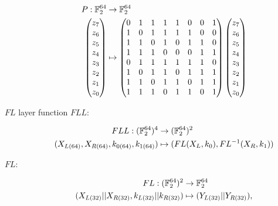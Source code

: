 \begin{description}
\begin{align*}
    P:\mathbb{F}_2^{64} &\rightarrow \mathbb{F}_2^{64} \\
    \begin{pmatrix}z_7\\z_6\\z_5\\z_4\\z_3\\z_2\\z_1\\z_0\end{pmatrix}&\mapsto
    \begin{pmatrix}
        0 & 1 & 1 & 1 & 1 & 0 & 0 & 1 \\
        1 & 0 & 1 & 1 & 1 & 1 & 0 & 0 \\
        1 & 1 & 0 & 1 & 0 & 1 & 1 & 0 \\
        1 & 1 & 1 & 0 & 0 & 0 & 1 & 1 \\
        0 & 1 & 1 & 1 & 1 & 1 & 1 & 0 \\
        1 & 0 & 1 & 1 & 0 & 1 & 1 & 1 \\
        1 & 1 & 0 & 1 & 1 & 0 & 1 & 1 \\
        1 & 1 & 1 & 0 & 1 & 1 & 0 & 1
    \end{pmatrix}\begin{pmatrix}z_7\\z_6\\z_5\\z_4\\z_3\\z_2\\z_1\\z_0\end{pmatrix}
\end{align*}

\item[$FL$ layer function $FLL$:]

\begin{align*}
    FLL:(\mathbb{F}_2^{64})^4 &\rightarrow (\mathbb{F}_2^{64})^2 \\
    (X_{L(64)},X_{R(64)},k_{0(64)},k_{1(64)})&\mapsto (FL(X_L,k_0),FL^{-1}(X_R,k_1))
\end{align*}

\item[$FL$:]

\begin{align*}
    FL:(\mathbb{F}_2^{64})^2 &\rightarrow \mathbb{F}_2^{64} \\
    (X_{L(32)}||X_{R(32)},k_{L(32)}||k_{R(32)})&\mapsto (Y_{L(32)}||Y_{R(32)}),
\end{align*}


\end{description}
